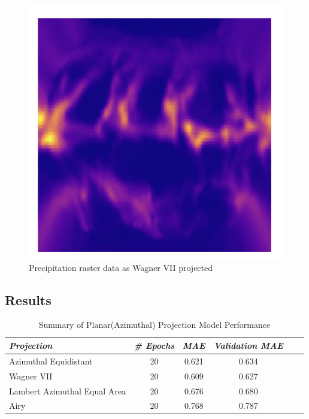 \begin{figure}[H]
    \begin{minipage}{0.30\textwidth}
        \centering
        \includegraphics[width=0.9\linewidth]{figures/chapter-8/prect_wag.png}
        \caption{Precipitation raster data as Wagner VII projected}
        \label{fig:wag_prect_raster}
    \end{minipage}\hfill
\end{figure}

\subsection{Results}
\begin{table}[ht]
    \centering
    \caption{Summary of Planar(Azimuthal) Projection Model Performance}
    \label{planner_results_table}
    \renewcommand{\arraystretch}{1.2} %
    \begin{tabular}{|l|c|c|c|c|c|}
        \hline
        \rowcolor[gray]{0.9}
        \textbf{\emph{Projection}}   & \textbf{\emph{\# Epochs}} & \textbf{\emph{MAE}} & \textbf{\emph{Validation MAE}} \\ \hline
        Azimuthal Equidistant        & 20                        & 0.621               & 0.634                          \\ \hline
        Wagner VII                   & 20                        & 0.609               & 0.627                          \\ \hline
        Lambert Azimuthal Equal Area & 20                        & 0.676               & 0.680                          \\ \hline
        Airy                         & 20                        & 0.768               & 0.787                          \\ \hline
    \end{tabular}
\end{table}
